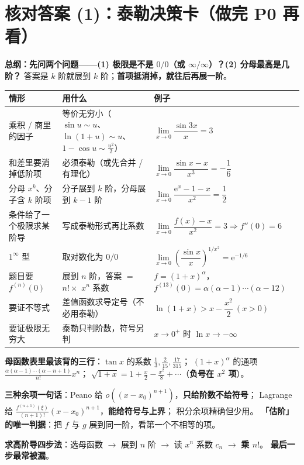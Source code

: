 \documentclass[10pt,a4paper]{ctexart}
\newcommand{\ee}{\mathrm{e}}
\begin{document}
\section*{核对答案 (1)：泰勒决策卡（做完 P0 再看）}
\textbf{总纲：先问两个问题——(1) 极限是不是 $0/0$（或 $\infty/\infty$）？(2) 分母最高是几阶？}
答案是 $k$ 阶就展到 $k$ 阶；\textbf{首项抵消掉，就往后再展一阶}。
\small
\setlength{\tabcolsep}{4pt}
\begin{tabularx}{\linewidth}{p{3.8cm}|p{4.6cm}|X}
\toprule
情形 & 用什么 & 例子 \\
\midrule
乘积 / 商里的因子 & 等价无穷小（$\sin u\sim u$、$\ln(1+u)\sim u$、$1-\cos u\sim\frac{u^{2}}2$） &
$\lim\limits_{x\to0}\dfrac{\sin 3x}{x}=3$\\
和差里要消掉低阶项 & 必须泰勒（或先合并 / 有理化） &
$\lim\limits_{x\to0}\dfrac{\sin x-x}{x^{3}}=-\dfrac16$\\
分母 $x^{k}$、分子含 $k$ 阶项 & 分子展到 $k$ 阶，分母展到 $k-1$ 阶 &
$\lim\limits_{x\to0}\dfrac{\ee^{x}-1-x}{x^{2}}=\dfrac12$\\
条件给了一个极限求某阶导 & 写成泰勒形式再比系数 &
$\lim\limits_{x\to0}\dfrac{f(x)-x}{x^{2}}=3\Rightarrow f''(0)=6$\\
$1^\infty$ 型 & 取对数化为 $0/0$ &
$\lim\limits_{x\to0}\left(\dfrac{\sin x}{x}\right)^{1/x^{2}}=\ee^{-1/6}$\\
题目要 $f^{(n)}(0)$ & 展到 $n$ 阶，答案 $=$ $n!\times$ $x^{n}$ 系数 &
$f=(1+x)^{\alpha}$，$f^{(13)}(0)=\alpha(\alpha-1)\cdots(\alpha-12)$\\
要证不等式 & 差值函数求导定号（不必用泰勒） &
$\ln(1+x)>x-\dfrac{x^{2}}2\ (x>0)$\\
要证极限无穷大 & 泰勒只判阶数，符号另判 &
$x\to0^{+}$ 时 $\ln x\to-\infty$\\
\bottomrule
\end{tabularx}
\normalsize\smallskip
\textbf{母函数表里最该背的三行}：$\tan x$ 的系数 $\frac13,\frac{2}{15},\frac{17}{315}$；
$(1+x)^{\alpha}$ 的通项 $\frac{\alpha(\alpha-1)\cdots(\alpha-n+1)}{n!}x^{n}$；
$\sqrt{1+x}=1+\frac{x}{2}-\frac{x^{2}}8+\cdots$（\textbf{负号在 $x^{2}$ 项}）。
\vspace{0.2em}

\textbf{三种余项一句话}：Peano 给 $o((x-x_0)^{n+1})$，\textbf{只给阶数不给符号}；
Lagrange 给 $\frac{f^{(n+1)}(\xi)}{(n+1)!}(x-x_0)^{n+1}$，\textbf{能给符号与上界}；
积分余项精确但少用。
\textbf{「估阶」的唯一判据}：把 $f$ 与 $g$ 展到同一阶，看第一个不相等的项。
\vspace{0.2em}

\textbf{求高阶导四步法}：选母函数 $\to$ 展到 $n$ 阶 $\to$ 读 $x^{n}$ 系数 $c_n$ $\to$ \textbf{乘 $n!$}。
\textbf{最后一步最常被漏}。
\end{document}
